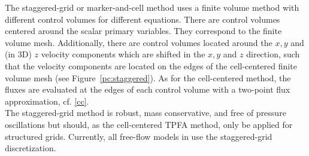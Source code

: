 The staggered-grid or marker-and-cell method uses a finite volume method with different control volumes for different equations. There are control volumes centered around the scalar primary variables. They correspond to the finite volume mesh. Additionally, there are control volumes located around the $x,y$ and (in 3D) $z$ velocity components which are shifted in the $x,y$ and $z$ direction, such that the velocity components are located on the edges of the cell-centered finite volume mesh (see Figure~\ref{pc:staggered}). As for the cell-centered method, the fluxes are evaluated at the edges of each control volume with a two-point flux approximation, cf. \ref{cc}.\\
The staggered-grid method is robust, mass conservative, and free of pressure oscillations
but should, as the cell-centered TPFA method, only be applied for structured grids.
Currently, all free-flow models in \Dumux use the staggered-grid discretization.

